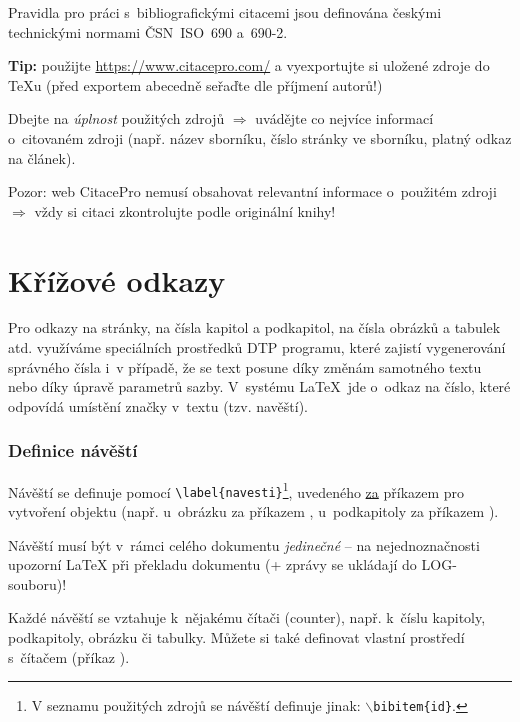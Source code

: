 Pravidla pro práci s~bibliografickými citacemi jsou definována českými technickými normami ČSN~ISO~690 a~690-2.
\par {\bf Tip:} použijte \url{https://www.citacepro.com/} a vyexportujte si uložené zdroje do TeXu (před exportem abecedně seřaďte dle příjmení autorů!)
\par 
Dbejte na {\em úplnost} použitých zdrojů $\Rightarrow$ uvádějte co nejvíce informací o~citovaném zdroji (např. název sborníku, číslo stránky ve sborníku, platný odkaz na článek). \par
Pozor: web CitacePro nemusí obsahovat relevantní informace o~použitém zdroji $\Rightarrow$ vždy si citaci zkontrolujte podle originální knihy!






\section{Křížové odkazy} \label{kap-odkazy}
Pro odkazy na stránky, na čísla kapitol a podkapitol, na čísla obrázků a tabulek atd. využíváme
speciálních prostředků DTP programu, které zajistí vygenerování správného čísla i~v případě, že se
text posune díky změnám samotného textu nebo díky úpravě parametrů sazby. V~systému \LaTeX\ jde o~odkaz na číslo, které odpovídá umístění značky v~textu (tzv. navěští).

\subsubsection{Definice návěští}

Návěští se definuje pomocí {\tt \textbackslash label\{navesti\}}\footnote{V seznamu použitých zdrojů se návěští definuje jinak: {\tt $\backslash$bibitem\{id\}}.\label{poznBibitem}}, uvedeného \underline{za} příkazem pro vytvoření objektu (např. u~obrázku za příkazem , u~podkapitoly za příkazem ).\par 
{\color{red} Návěští musí být v~rámci celého dokumentu {\em jedinečné}} -- na nejednoznačnosti upozorní {\LaTeX} při překladu dokumentu (+ zprávy se ukládají do LOG-souboru)!
\par 
Každé návěští se vztahuje k~nějakému čítači (coun\-ter), např. k~číslu kapitoly, podkapitoly, obrázku či tabulky. Můžete si také definovat vlastní prostředí
s~čítačem (příkaz ).

